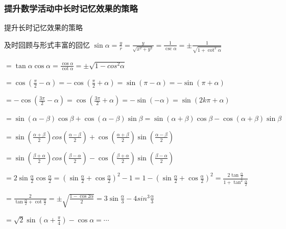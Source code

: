 \documentclass[serif]{beamer}
\begin{document}
    \subsubsection{提升数学活动中长时记忆效果的策略}
        \begin{frame}{提升长时记忆效果的策略}
           \begin{block}{及时回顾与形式丰富的回忆}
           	$ \sin \alpha=\frac{y}{r}=\frac{y}{\sqrt{x^2+y^2}}=\frac{1}{\csc \alpha}=\pm \frac{1}{\sqrt{1+\cot^2\alpha}} $
           	
           	$=\tan \alpha \cos \alpha=\frac{\cos \alpha}{\cot \alpha}=\pm \sqrt{1-cos^2\alpha} $
           
            $ =\cos (\frac{\pi}{2}-\alpha) =-\cos (\frac{\pi}{2}+\alpha) =\sin (\pi-\alpha)=-\sin (\pi+\alpha)  $
            
            $ =-\cos (\frac{3\pi}{2}-\alpha) =\cos (\frac{3\pi}{2}+\alpha) =-\sin (-\alpha)=\sin (2k\pi+\alpha)  $
            
            $ =\sin(\alpha-\beta) \cos \beta + \cos (\alpha-\beta) \sin \beta  =\sin(\alpha+\beta) \cos \beta - \cos (\alpha+\beta) \sin \beta$
            
            $=\sin(\frac{\alpha+\beta}{2})cos(\frac{\alpha-\beta}{2})+\cos(\frac{\alpha+\beta}{2})\sin(\frac{\alpha-\beta}{2}) $
            
            $=\sin(\frac{\beta+\alpha}{2})cos(\frac{\beta-\alpha}{2})-\cos(\frac{\beta+\alpha}{2})\sin(\frac{\beta-\alpha}{2}) $ 
            
            $=2\sin\frac{\alpha}{2} \cos \frac{\alpha}{2}=(\sin\frac{\alpha}{2}+\cos\frac{\alpha}{2})^2-1=1-(\sin\frac{\alpha}{2}+\cos\frac{\alpha}{2})^2=\frac{2\tan\frac{\alpha}{2}}{1+\tan^2\frac{\alpha}{2}} $
            
            $ =\frac{2}{\tan\frac{\alpha}{2}+\cot\frac{\alpha}{2}}=\pm \sqrt{\frac{1-\cos2\alpha}{2}}=3\sin\frac{\alpha}{3}-4sin^3\frac{\alpha}{3}$
            
            $=\sqrt{2}\sin(\alpha+\frac{\pi}{4})-\cos\alpha=\cdots $
           \end{block}
        \end{frame}
    
\end{document}
